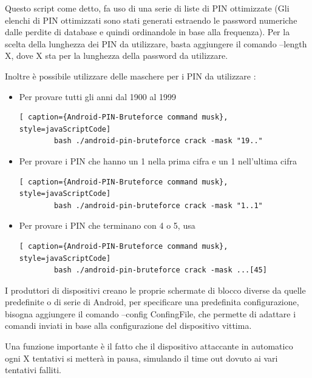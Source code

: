 Questo script come detto, fa uso di una serie di liste di PIN ottimizzate (Gli elenchi di PIN ottimizzati sono stati generati estraendo le password numeriche dalle perdite di database e quindi ordinandole in base alla frequenza). Per la scelta della lunghezza dei PIN da utilizzare, basta aggiungere il comando –length X, dove X sta per la lunghezza della password da utilizzare.

Inoltre è possibile utilizzare delle maschere per i PIN da utilizzare :
\begin{itemize}
	\item Per provare tutti gli anni dal 1900 al 1999 \newline
	\begin{lstlisting}[ caption={Android-PIN-Bruteforce command musk}, style=javaScriptCode]
		bash ./android-pin-bruteforce crack -mask "19.."
	\end{lstlisting}
	\item Per provare i PIN che hanno un 1 nella prima cifra e un 1 nell’ultima cifra \newline
	\begin{lstlisting}[ caption={Android-PIN-Bruteforce command musk}, style=javaScriptCode]
		bash ./android-pin-bruteforce crack -mask "1..1"
	\end{lstlisting}
	\item Per provare i PIN che terminano con 4 o 5, usa \newline
	\begin{lstlisting}[ caption={Android-PIN-Bruteforce command musk}, style=javaScriptCode]
		bash ./android-pin-bruteforce crack -mask ...[45]
	\end{lstlisting}
\end{itemize}

I produttori di dispositivi creano le proprie schermate di blocco diverse da quelle predefinite o di serie di Android, per specificare una predefinita configurazione, bisogna aggiungere il comando –config ConfingFile, che permette di adattare i comandi inviati in base alla configurazione del dispositivo vittima.

Una funzione importante è il fatto che il dispositivo attaccante in automatico ogni X tentativi si metterà in pausa, simulando il time out dovuto ai vari tentativi falliti.

